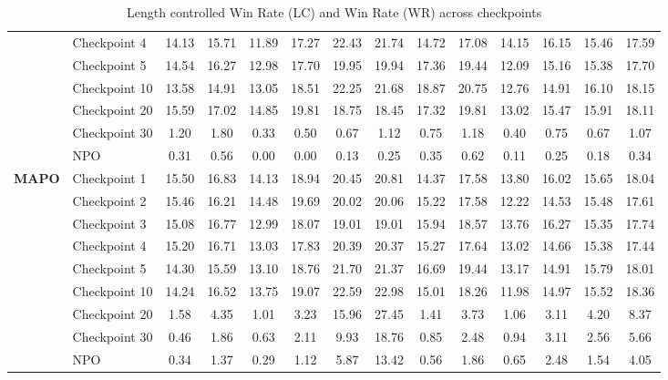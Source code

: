 \begin{table}[t]
\begin{tabular}{ll|cc|cc|cc|cc|cc|cc}
 & Checkpoint 4  & 14.13 & 15.71 & 11.89 & 17.27 & 22.43 & 21.74 & 14.72 & 17.08 & 14.15 & 16.15 & 15.46 & 17.59 \\
 & Checkpoint 5  & 14.54 & 16.27 & 12.98 & 17.70 & 19.95 & 19.94 & 17.36 & 19.44 & 12.09 & 15.16 & 15.38 & 17.70 \\
 & Checkpoint 10 & 13.58 & 14.91 & 13.05 & 18.51 & 22.25 & 21.68 & 18.87 & 20.75 & 12.76 & 14.91 & 16.10 & 18.15 \\
 & Checkpoint 20 & 15.59 & 17.02 & 14.85 & 19.81 & 18.75 & 18.45 & 17.32 & 19.81 & 13.02 & 15.47 & 15.91 & 18.11 \\
 & Checkpoint 30 & 1.20 & 1.80 & 0.33 & 0.50 & 0.67 & 1.12 & 0.75 & 1.18 & 0.40 & 0.75 & 0.67 & 1.07 \\
 & NPO           & 0.31 & 0.56 & 0.00 & 0.00 & 0.13 & 0.25 & 0.35 & 0.62 & 0.11 & 0.25 & 0.18 & 0.34 \\
\midrule
\multirow{9}{*}{\textbf{MAPO}} & Checkpoint 1  & 15.50 & 16.83 & 14.13 & 18.94 & 20.45 & 20.81 & 14.37 & 17.58 & 13.80 & 16.02 & 15.65 & 18.04 \\
 & Checkpoint 2  & 15.46 & 16.21 & 14.48 & 19.69 & 20.02 & 20.06 & 15.22 & 17.58 & 12.22 & 14.53 & 15.48 & 17.61 \\
 & Checkpoint 3  & 15.08 & 16.77 & 12.99 & 18.07 & 19.01 & 19.01 & 15.94 & 18.57 & 13.76 & 16.27 & 15.35 & 17.74 \\
 & Checkpoint 4  & 15.20 & 16.71 & 13.03 & 17.83 & 20.39 & 20.37 & 15.27 & 17.64 & 13.02 & 14.66 & 15.38 & 17.44 \\
 & Checkpoint 5  & 14.30 & 15.59 & 13.10 & 18.76 & 21.70 & 21.37 & 16.69 & 19.44 & 13.17 & 14.91 & 15.79 & 18.01 \\
 & Checkpoint 10 & 14.24 & 16.52 & 13.75 & 19.07 & 22.59 & 22.98 & 15.01 & 18.26 & 11.98 & 14.97 & 15.52 & 18.36 \\
 & Checkpoint 20 & 1.58 & 4.35 & 1.01 & 3.23 & 15.96 & 27.45 & 1.41 & 3.73 & 1.06 & 3.11 & 4.20 & 8.37 \\
 & Checkpoint 30 & 0.46 & 1.86 & 0.63 & 2.11 & 9.93 & 18.76 & 0.85 & 2.48 & 0.94 & 3.11 & 2.56 & 5.66 \\
 & NPO           & 0.34 & 1.37 & 0.29 & 1.12 & 5.87 & 13.42 & 0.56 & 1.86 & 0.65 & 2.48 & 1.54 & 4.05 \\
\bottomrule
\end{tabular}
\caption{Length controlled Win Rate (LC) and Win Rate (WR) across checkpoints}
\label{tab:npo_checkpoints}
\end{table}
